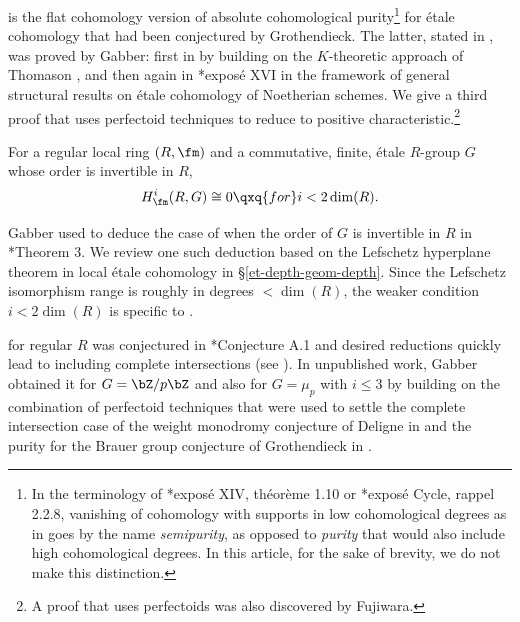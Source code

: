  is the flat cohomology version of absolute cohomological purity\footnote{\label{foot:semipurity}In the terminology of \cite{SGA2new}*{expos\'{e} XIV, th\'{e}or\`{e}me 1.10} or \cite{SGA4.5}*{expos\'{e} Cycle, rappel 2.2.8}, vanishing of cohomology with supports in low cohomological degrees as in  goes by the name \emph{semipurity}, as opposed to \emph{purity} that would also include high cohomological degrees. In this article, for the sake of brevity, we do not make this distinction.} for \'{e}tale cohomology that had been conjectured by Grothendieck. The latter, stated in , was proved by Gabber: first in \cite{Fuj02} by building on the $K$-theoretic approach of Thomason \cite{Tho84}, and then again in \cite{ILO14}*{expos\'{e} XVI} in the framework of general structural results on \'{e}tale cohomology of Noetherian schemes. We give a third proof that uses perfectoid techniques to reduce to positive characteristic.\footnote{A proof that uses perfectoids was also discovered by Fujiwara.}

 \label{abs-coh-pur-ann}
For a regular local ring $(R, \fm)$ and a commutative, finite, \'{e}tale $R$-group $G$ whose order is invertible in $R$,
\[
H^i_\fm(R, G) \cong 0 \qxq{for} i < 2\dim(R).
\]
\ethm




Gabber used  to deduce the case of  when the order of $G$ is invertible in $R$ in \cite{Gab04}*{Theorem 3}. We review one such deduction based on the Lefschetz hyperplane theorem in local \'{e}tale cohomology in \S\ref{et-depth-geom-depth}. Since the Lefschetz isomorphism range is roughly in degrees $< \dim(R)$, the weaker condition $i < 2\dim(R)$ is specific to . %


 for regular $R$ was conjectured in \cite{Pop19}*{Conjecture A.1} and desired reductions quickly lead to including complete intersections (see ).
In unpublished work, Gabber obtained it %
for $G = \bZ/p\bZ$ and  also for $G = \mu_p$ with $i \le 3$ by building on the combination of perfectoid techniques that were used to settle the complete intersection case of the weight monodromy conjecture of Deligne in \cite{Sch12} and the purity for the Brauer group conjecture of Grothendieck in \cite{brauer-purity}.

